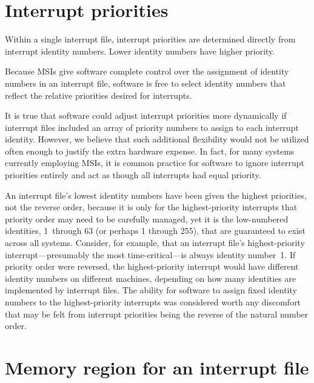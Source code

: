 \section{Interrupt priorities}

Within a single interrupt file, interrupt priorities are determined
directly from interrupt identity numbers.
Lower identity numbers have higher priority.

\begin{commentary}
Because MSIs give software complete control over the assignment of
identity numbers in an interrupt file, software is free to select
identity numbers that reflect the relative priorities desired for
interrupts.

It is true that software could adjust interrupt priorities more
dynamically if interrupt files included an array of priority numbers to
assign to each interrupt identity.
However, we believe that such additional flexibility would not be
utilized often enough to justify the extra hardware expense.
In fact, for many systems currently employing MSIs, it is common
practice for software to ignore interrupt priorities entirely and act
as though all interrupts had equal priority.
\end{commentary}

\begin{commentary}
An interrupt file's lowest identity numbers have been given the
highest priorities, not the reverse order, because it is only for
the highest-priority interrupts that priority order may need to be
carefully managed, yet it is the low-numbered identities, 1~through 63
(or perhaps 1 through 255), that are guaranteed to exist across all
systems.
Consider, for example, that an interrupt file's highest-priority
interrupt---presumably the most time-critical---is always identity
number~1.
If priority order were reversed, the highest-priority interrupt would
have different identity numbers on different machines, depending on how
many identities are implemented by interrupt files.
The ability for software to assign fixed identity numbers to the
highest-priority interrupts was considered worth any discomfort that
may be felt from interrupt priorities being the reverse of the natural
number order.
\end{commentary}

\section{Memory region for an interrupt file}
\label{sec:IMSIC-memRegion}

